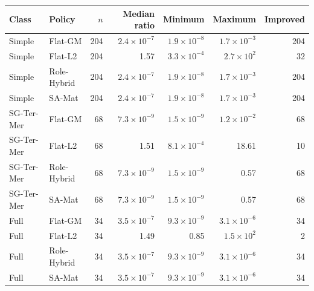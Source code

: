 \begin{tabular}{llrrrrr}
\toprule
Class & Policy & $n$ & Median ratio & Minimum & Maximum & Improved \\
\midrule
Simple & Flat-GM & 204 & $2.4\times10^{-7}$ & $1.9\times10^{-8}$ & $1.7\times10^{-3}$ & 204 \\
Simple & Flat-L2 & 204 & 1.57 & $3.3\times10^{-4}$ & $2.7\times10^{2}$ & 32 \\
Simple & Role-Hybrid & 204 & $2.4\times10^{-7}$ & $1.9\times10^{-8}$ & $1.7\times10^{-3}$ & 204 \\
Simple & SA-Mat & 204 & $2.4\times10^{-7}$ & $1.9\times10^{-8}$ & $1.7\times10^{-3}$ & 204 \\
\addlinespace
SG-Ter-Mer & Flat-GM & 68 & $7.3\times10^{-9}$ & $1.5\times10^{-9}$ & $1.2\times10^{-2}$ & 68 \\
SG-Ter-Mer & Flat-L2 & 68 & 1.51 & $8.1\times10^{-4}$ & 18.61 & 10 \\
SG-Ter-Mer & Role-Hybrid & 68 & $7.3\times10^{-9}$ & $1.5\times10^{-9}$ & 0.57 & 68 \\
SG-Ter-Mer & SA-Mat & 68 & $7.3\times10^{-9}$ & $1.5\times10^{-9}$ & 0.57 & 68 \\
\addlinespace
Full & Flat-GM & 34 & $3.5\times10^{-7}$ & $9.3\times10^{-9}$ & $3.1\times10^{-6}$ & 34 \\
Full & Flat-L2 & 34 & 1.49 & 0.85 & $1.5\times10^{2}$ & 2 \\
Full & Role-Hybrid & 34 & $3.5\times10^{-7}$ & $9.3\times10^{-9}$ & $3.1\times10^{-6}$ & 34 \\
Full & SA-Mat & 34 & $3.5\times10^{-7}$ & $9.3\times10^{-9}$ & $3.1\times10^{-6}$ & 34 \\
\bottomrule
\end{tabular}
